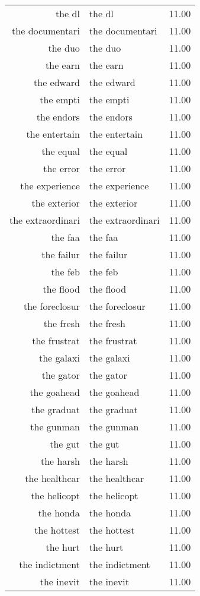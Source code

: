 \begin{table}[ht]
\begin{tabular}{rlr}
  the dl & the dl & 11.00 \\ 
  the documentari & the documentari & 11.00 \\ 
  the duo & the duo & 11.00 \\ 
  the earn & the earn & 11.00 \\ 
  the edward & the edward & 11.00 \\ 
  the empti & the empti & 11.00 \\ 
  the endors & the endors & 11.00 \\ 
  the entertain & the entertain & 11.00 \\ 
  the equal & the equal & 11.00 \\ 
  the error & the error & 11.00 \\ 
  the experience & the experience & 11.00 \\ 
  the exterior & the exterior & 11.00 \\ 
  the extraordinari & the extraordinari & 11.00 \\ 
  the faa & the faa & 11.00 \\ 
  the failur & the failur & 11.00 \\ 
  the feb & the feb & 11.00 \\ 
  the flood & the flood & 11.00 \\ 
  the foreclosur & the foreclosur & 11.00 \\ 
  the fresh & the fresh & 11.00 \\ 
  the frustrat & the frustrat & 11.00 \\ 
  the galaxi & the galaxi & 11.00 \\ 
  the gator & the gator & 11.00 \\ 
  the goahead & the goahead & 11.00 \\ 
  the graduat & the graduat & 11.00 \\ 
  the gunman & the gunman & 11.00 \\ 
  the gut & the gut & 11.00 \\ 
  the harsh & the harsh & 11.00 \\ 
  the healthcar & the healthcar & 11.00 \\ 
  the helicopt & the helicopt & 11.00 \\ 
  the honda & the honda & 11.00 \\ 
  the hottest & the hottest & 11.00 \\ 
  the hurt & the hurt & 11.00 \\ 
  the indictment & the indictment & 11.00 \\ 
  the inevit & the inevit & 11.00 \\ 

\end{tabular}
\end{table}
